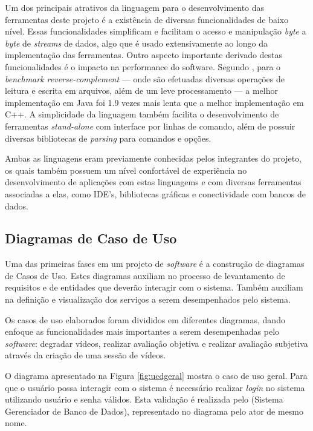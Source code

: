 Um dos principais atrativos da linguagem para o desenvolvimento das ferramentas deste projeto é a existência de diversas funcionalidades de baixo nível.
Essas funcionalidades simplificam e facilitam o acesso e manipulação \emph{byte} a \emph{byte} de \emph{streams} de dados, algo que é usado extensivamente ao longo da implementação das ferramentas.
Outro aspecto importante derivado destas funcionalidades é o impacto na performance do software. 
Segundo \cite{benchmarks}, para o \emph{benchmark reverse-complement} --- onde são efetuadas diversas operações de leitura e escrita em arquivos, além de um leve processamento --- a melhor implementação em Java foi 1.9 vezes mais lenta que a melhor implementação em C++.
A simplicidade da linguagem também facilita o desenvolvimento de ferramentas \emph{stand-alone} com interface por linhas de comando, além de possuir diversas bibliotecas de \emph{parsing} para comandos e opções.

Ambas as linguagens eram previamente conhecidas pelos integrantes do projeto, os quais também possuem um nível confortável de experiência no desenvolvimento de aplicações com estas linguagems e com diversas ferramentas associadas a elas, como IDE's, bibliotecas gráficas e conectividade com bancos de dados.

\subsection{Diagramas de Caso de Uso}

Uma das primeiras fases em um projeto de \emph{software} é a construção de diagramas de Casos de Uso. Estes diagramas auxiliam no processo de levantamento de requisitos e de entidades que deverão interagir com o sistema. Também auxiliam na definição e visualização dos serviços a serem desempenhados pelo sistema.

Os casos de uso elaborados foram divididos em diferentes diagramas, dando enfoque as funcionalidades mais importantes a serem desempenhadas pelo \emph{software}: degradar vídeos, realizar avaliação objetiva e realizar avaliação subjetiva através da criação de uma sessão de vídeos.

O diagrama apresentado na Figura \ref{fig:ucdgeral} mostra o caso de uso geral. Para que o usuário possa interagir com o sistema é necessário realizar \emph{login} no sistema utilizando usuário e senha válidos. Esta validação é realizada pelo  (Sistema Gerenciador de Banco de Dados), representado no diagrama pelo ator de mesmo nome.

